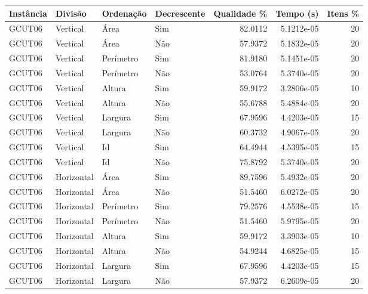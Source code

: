 \begin{tabular}{llllrrr}
    \hline
    Instância & Divisão     & Ordenação & Decrescente & Qualidade \% & Tempo (s)  & Itens \% \\
    \hline
    GCUT06    & Vertical    & Área      & Sim         & 82.0112      & 5.1212e-05 & 20       \\
    GCUT06    & Vertical    & Área      & Não         & 57.9372      & 5.1832e-05 & 20       \\
    GCUT06    & Vertical    & Perímetro & Sim         & 81.9180      & 5.1451e-05 & 20       \\
    GCUT06    & Vertical    & Perímetro & Não         & 53.0764      & 5.3740e-05 & 20       \\
    GCUT06    & Vertical    & Altura    & Sim         & 59.9172      & 3.2806e-05 & 10       \\
    GCUT06    & Vertical    & Altura    & Não         & 55.6788      & 5.4884e-05 & 20       \\
    GCUT06    & Vertical    & Largura   & Sim         & 67.9596      & 4.4203e-05 & 15       \\
    GCUT06    & Vertical    & Largura   & Não         & 60.3732      & 4.9067e-05 & 20       \\
    GCUT06    & Vertical    & Id        & Sim         & 64.4944      & 4.5395e-05 & 15       \\
    GCUT06    & Vertical    & Id        & Não         & 75.8792      & 5.3740e-05 & 20       \\
    GCUT06    & Horizontal  & Área      & Sim         & 89.7596      & 5.4932e-05 & 20       \\
    GCUT06    & Horizontal  & Área      & Não         & 51.5460      & 6.0272e-05 & 20       \\
    GCUT06    & Horizontal  & Perímetro & Sim         & 79.2576      & 4.5538e-05 & 15       \\
    GCUT06    & Horizontal  & Perímetro & Não         & 51.5460      & 5.9795e-05 & 20       \\
    GCUT06    & Horizontal  & Altura    & Sim         & 59.9172      & 3.3903e-05 & 10       \\
    GCUT06    & Horizontal  & Altura    & Não         & 54.9244      & 4.6825e-05 & 15       \\
    GCUT06    & Horizontal  & Largura   & Sim         & 67.9596      & 4.4203e-05 & 15       \\
    GCUT06    & Horizontal  & Largura   & Não         & 57.9372      & 6.2609e-05 & 20       \\

\end{tabular}
